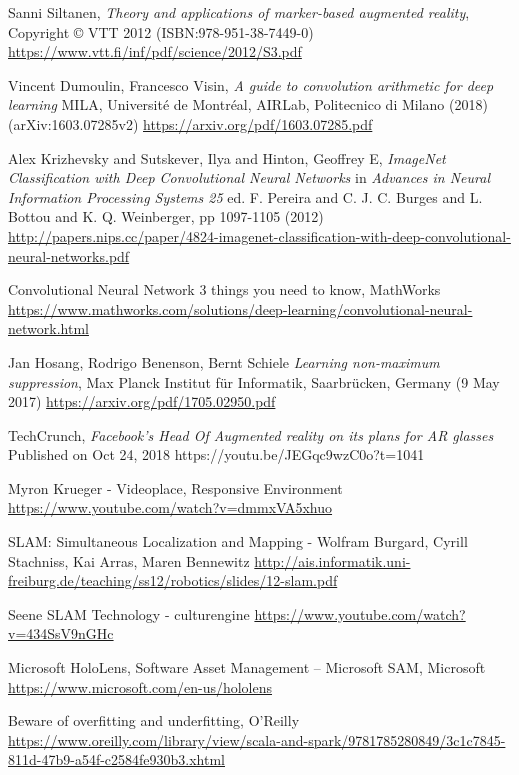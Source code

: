 
\begin{thebibliography}{X}

Sanni Siltanen, \textit{Theory and applications of marker-based augmented reality},
Copyright © VTT 2012 (ISBN:978-951-38-7449-0)
\url{https://www.vtt.fi/inf/pdf/science/2012/S3.pdf}

Vincent Dumoulin, Francesco Visin, \textit{A guide to convolution arithmetic for deep learning}
 MILA, Universit\'e de Montr\'eal,
AIRLab, Politecnico di Milano (2018)
(arXiv:1603.07285v2)
\url{https://arxiv.org/pdf/1603.07285.pdf}


Alex Krizhevsky and Sutskever, Ilya and Hinton, Geoffrey E, \textit{ImageNet Classification with Deep Convolutional Neural Networks} in \textit{Advances in Neural Information Processing Systems 25} ed. F. Pereira and C. J. C. Burges and L. Bottou and K. Q. Weinberger, pp 1097-1105 (2012)
\url{http://papers.nips.cc/paper/4824-imagenet-classification-with-deep-convolutional-neural-networks.pdf}

Convolutional Neural Network 3 things you need to know, MathWorks
\url{https://www.mathworks.com/solutions/deep-learning/convolutional-neural-network.html}

Jan Hosang, Rodrigo Benenson, Bernt Schiele \textit{Learning non-maximum suppression}, Max Planck Institut für Informatik, Saarbrücken, Germany (9 May 2017)
\url{https://arxiv.org/pdf/1705.02950.pdf}

TechCrunch, \textit{Facebook's Head Of Augmented reality on its plans for AR glasses}
Published on Oct 24, 2018
https://youtu.be/JEGqc9wzC0o?t=1041

Myron Krueger - Videoplace, Responsive Environment
\url{https://www.youtube.com/watch?v=dmmxVA5xhuo}

SLAM: Simultaneous Localization and Mapping - Wolfram Burgard, Cyrill Stachniss, Kai Arras, Maren Bennewitz
\url{http://ais.informatik.uni-freiburg.de/teaching/ss12/robotics/slides/12-slam.pdf}

Seene SLAM Technology - culturengine
\url{https://www.youtube.com/watch?v=434SsV9nGHc}

Microsoft HoloLens, Software Asset Management – Microsoft SAM, Microsoft
\url{https://www.microsoft.com/en-us/hololens}

Beware of overfitting and underfitting, O'Reilly
\url{https://www.oreilly.com/library/view/scala-and-spark/9781785280849/3c1c7845-811d-47b9-a54f-c2584fe930b3.xhtml}


\end{thebibliography}
